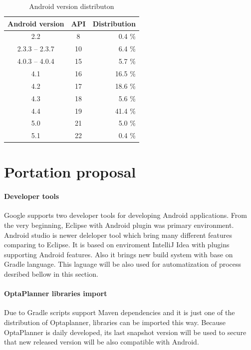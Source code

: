 \begin {table}[h!]
    \begin{tabular}{|c|c|r|}
        \hline
        Android version   & API   & Distribution  \\ \hline \hline
        2.2               & 8     & 0.4 \%        \\ \hline
        2.3.3 -- 2.3.7    & 10    & 6.4 \%        \\ \hline
        4.0.3 -- 4.0.4    & 15    & 5.7 \%        \\ \hline
        4.1               & 16    & 16.5 \%       \\ \hline
        4.2               & 17    & 18.6 \%       \\ \hline
        4.3               & 18    & 5.6 \%        \\ \hline
        4.4               & 19    & 41.4 \%       \\ \hline
        5.0               & 21    & 5.0 \%        \\ \hline
        5.1               & 22    & 0.4 \%        \\ \hline
    \end{tabular}
    \centering
    \caption{Android version distributon \cite{Dashboards}}
    \label{distributon}
\end{table}


\section{Portation proposal}

\paragraph{Developer tools}
Google supports two developer tools for developing Android applications. From the very beginning, Eclipse with Android
plugin was primary environment. Android studio is newer deleloper tool which bring many different features comparing to
Eclipse. It is based on enviroment IntelliJ Idea with plugins supporting Android features. Also it brings
new build system with base on Gradle language. This laguage will be also used for automatization of process desribed
bellow in this section.

\paragraph{OptaPlanner libraries import}
Due to Gradle scripts support Maven dependencies and it is just one of the distribution of Optaplanner, libraries can
be imported this way. Because OptaPlanner is daily developed, its last snapshot version will be used to secure that new
released version will be also compatible with Android.

